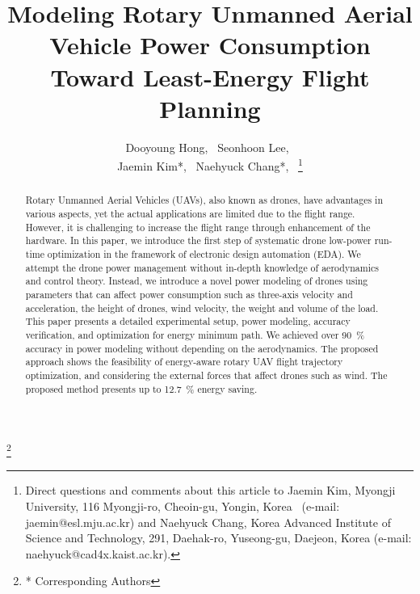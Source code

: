 \documentclass[journal]{./template/IEEEtran}
\begin{document}
\makeatletter

\newcommand\blfootnote[1]{%
  \begingroup
  \renewcommand\thefootnote{}\footnote{#1}%
  \addtocounter{footnote}{-1}%
  \endgroup
}

\newcommand\fs@norules{\def\@fs@cfont{\bfseries}\let\@fs@capt\floatc@ruled
  \def\@fs@pre{}%
  \def\@fs@post{}%
  \def\@fs@mid{\kern3pt}%
  \let\@fs@iftopcapt\iftrue}
\makeatother
{}

\title{Modeling Rotary Unmanned Aerial Vehicle Power Consumption Toward Least-Energy Flight Planning\\
}
\author{
Dooyoung Hong,~
Seonhoon Lee,~\\
Jaemin Kim*,~
Naehyuck Chang*,~
\thanks{Direct questions and comments about this article to Jaemin Kim, Myongji University, 116 Myongji-ro, Cheoin-gu, Yongin, Korea~ (e-mail: jaemin@esl.mju.ac.kr) and Naehyuck Chang, Korea Advanced Institute of Science and Technology, 291, Daehak-ro, Yuseong-gu, Daejeon, Korea (e-mail: naehyuck@cad4x.kaist.ac.kr).}
}
\maketitle
\blfootnote{* Corresponding Authors}

\begin{abstract}

Rotary Unmanned Aerial Vehicles (UAVs), also known as drones, have advantages in various aspects, yet the actual applications are limited due to the flight range. However, it is challenging to increase the flight range through enhancement of the hardware. 
In this paper, we introduce the first step of systematic drone low-power run-time optimization in the framework of electronic design automation (EDA). 
We attempt the drone power management without in-depth knowledge of aerodynamics and control theory. 
Instead, we introduce a novel power modeling of drones using parameters that can affect power consumption such as three-axis velocity and acceleration, the height of drones, wind velocity, the weight and volume of the load. 
This paper presents a detailed experimental setup, power modeling, accuracy verification, and optimization for energy minimum path. 
We achieved over 90~\% accuracy in power modeling without depending on the aerodynamics. 
The proposed approach shows the feasibility of energy-aware rotary UAV flight trajectory optimization, and considering the external forces that affect drones such as wind. The proposed method presents up to 12.7~\% energy saving.
\label{Section: abstract}
\end{abstract}
\end{document}

